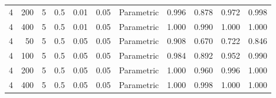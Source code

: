 \begin{table}
{{\begin{tabular}{rrrrrrlllll}
\hspace{1em}4 & 200 & 5 & 0.5 & 0.01 & 0.05 & Parametric & 0.996 & 0.878 & 0.972 & 0.998\\
\hspace{1em}4 & 400 & 5 & 0.5 & 0.01 & 0.05 & Parametric & 1.000 & 0.990 & 1.000 & 1.000\\
\hspace{1em}4 & 50 & 5 & 0.5 & 0.05 & 0.05 & Parametric & 0.908 & 0.670 & 0.722 & 0.846\\
\hspace{1em}4 & 100 & 5 & 0.5 & 0.05 & 0.05 & Parametric & 0.984 & 0.892 & 0.952 & 0.990\\
\hspace{1em}4 & 200 & 5 & 0.5 & 0.05 & 0.05 & Parametric & 1.000 & 0.960 & 0.996 & 1.000\\
\hspace{1em}4 & 400 & 5 & 0.5 & 0.05 & 0.05 & Parametric & 1.000 & 0.998 & 1.000 & 1.000\\
\bottomrule
\end{tabular}
}}
 \end{table}
